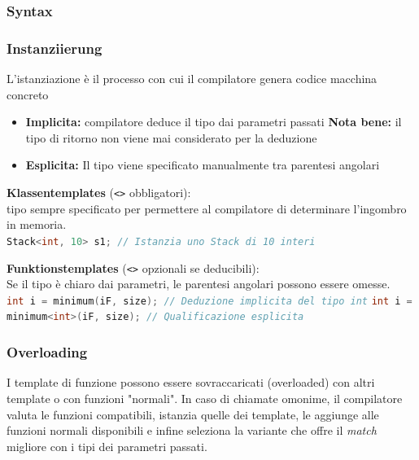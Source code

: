 \begin{center}
\end{center}

\subsubsection{Syntax}

\vspace{-0.5em}

\subsubsection{Instanziierung}

L'istanziazione è il processo con cui il compilatore genera codice macchina concreto\smallbreak

\begin{itemize}
    \item \textbf{Implicita:} compilatore deduce il tipo dai parametri passati 
    \textbf{Nota bene:} il tipo di ritorno non viene mai considerato per la deduzione
    \item \textbf{Esplicita:} Il tipo viene specificato manualmente tra parentesi angolari 
\end{itemize}\smallbreak

\textbf{Klassentemplates} (\verb|<>| obbligatori):\\
tipo sempre specificato per permettere al compilatore di determinare l'ingombro in memoria.\\
\lstinline[language=C++]|Stack<int, 10> s1; // Istanzia uno Stack di 10 interi|

\textbf{Funktionstemplates} (\verb|<>| opzionali se deducibili):\\
Se il tipo è chiaro dai parametri, le parentesi angolari possono essere omesse.\\
\lstinline[language=C++]|int i = minimum(iF, size); // Deduzione implicita del tipo int|
\lstinline[language=C++]|int i = minimum<int>(iF, size); // Qualificazione esplicita|

\subsubsection{Overloading}

I template di funzione possono essere sovraccaricati (overloaded) con altri template o con funzioni "normali". In caso di chiamate omonime, il compilatore valuta le funzioni compatibili, istanzia quelle dei template, le aggiunge alle funzioni normali disponibili e infine seleziona la variante che offre il \textit{match} migliore con i tipi dei parametri passati.

